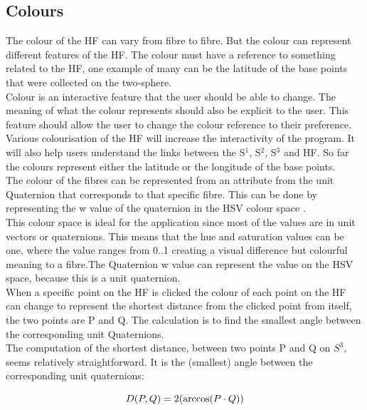 \documentclass[12pt]{article} %
\begin{document}
\begin{flushleft}
\subsection{Colours} %
The colour of the HF can vary from fibre to fibre. But the colour can represent different features of the HF. The colour must have a reference to something related to the HF, one example of many can be the latitude of the base points that were collected on the two-sphere.\\
Colour is an interactive feature that the user should be able to change. The meaning of what the colour represents should also be explicit to the user. This feature should allow the user to change the colour reference to their preference.\\
Various colourisation of the HF will increase the interactivity of the program. It will also help users understand the links between the S$^{1}$, S$^{2}$, S$^{3}$ and HF. So far the colours represent either the latitude or the longitude of the base points. \\
The colour of the fibres can be represented from an attribute from the unit Quaternion that corresponds to that specific fibre. This can be done by representing the w value of the quaternion in the HSV colour space \cite{Smith:bre}. \\
This colour space is ideal for the application since most of the values are in unit vectors or quaternions. This means that the hue and saturation values can be one, where the value ranges from 0..1 creating a visual difference but colourful meaning to a fibre.The Quaternion w value can represent the value on the HSV space, because this is a unit quaternion. \\
When a specific point on the HF is clicked the colour of each point on the HF can change to represent the shortest distance from the clicked point from itself, the two points are P and Q. The calculation is to find the smallest angle between the corresponding unit Quaternions.\\
The computation of the shortest distance, between two points P and Q on $S^{3}$, seems relatively straightforward. It is the (smallest) angle between the corresponding unit quaternions:

\begin{equation}\label{eq:colourdistance} \large D(P, Q) = 2(\arccos (P \cdot Q ) )\end{equation} \begin{center}\cite{Hanson:2006ds}\end{center}


\end{flushleft}
\end{document}

